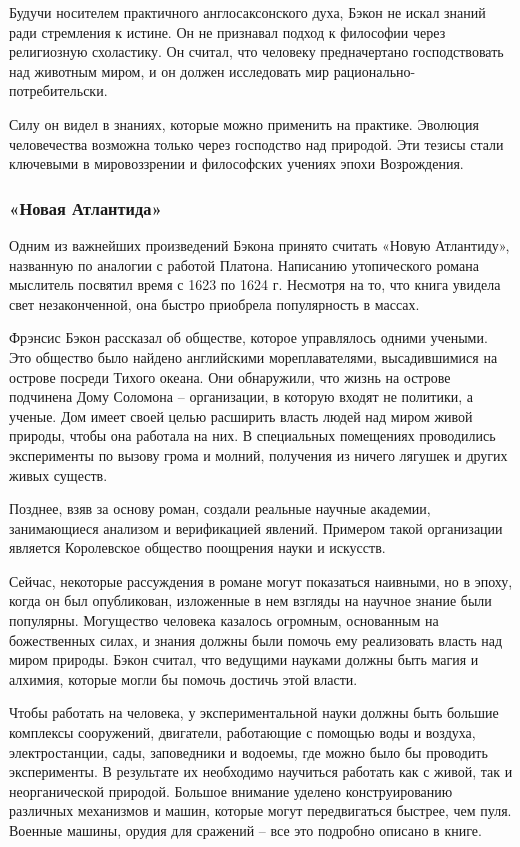 \documentclass[
]{article}
\begin{document}
Будучи носителем практичного англосаксонского духа, Бэкон не искал
знаний ради стремления к истине. Он не признавал подход к философии
через религиозную схоластику. Он считал, что человеку предначертано
господствовать над животным миром, и он должен исследовать мир
рационально-потребительски.

Силу он видел в знаниях, которые можно применить на практике. Эволюция
человечества возможна только через господство над природой. Эти тезисы
стали ключевыми в мировоззрении и философских учениях эпохи Возрождения.

\hypertarget{ux43dux43eux432ux430ux44f-ux430ux442ux43bux430ux43dux442ux438ux434ux430}{%
\subsubsection{«Новая
Атлантида»}\label{ux43dux43eux432ux430ux44f-ux430ux442ux43bux430ux43dux442ux438ux434ux430}}

Одним из важнейших произведений Бэкона принято считать «Новую
Атлантиду», названную по аналогии с работой Платона. Написанию
утопического романа мыслитель посвятил время с 1623 по 1624 г. Несмотря
на то, что книга увидела свет незаконченной, она быстро приобрела
популярность в массах.

Фрэнсис Бэкон рассказал об обществе, которое управлялось одними учеными.
Это общество было найдено английскими мореплавателями, высадившимися на
острове посреди Тихого океана. Они обнаружили, что жизнь на острове
подчинена Дому Соломона -- организации, в которую входят не политики, а
ученые. Дом имеет своей целью расширить власть людей над миром живой
природы, чтобы она работала на них. В специальных помещениях проводились
эксперименты по вызову грома и молний, получения из ничего лягушек и
других живых существ.

Позднее, взяв за основу роман, создали реальные научные академии,
занимающиеся анализом и верификацией явлений. Примером такой организации
является Королевское общество поощрения науки и искусств.

Сейчас, некоторые рассуждения в романе могут показаться наивными, но в
эпоху, когда он был опубликован, изложенные в нем взгляды на научное
знание были популярны. Могущество человека казалось огромным, основанным
на божественных силах, и знания должны были помочь ему реализовать
власть над миром природы. Бэкон считал, что ведущими науками должны быть
магия и алхимия, которые могли бы помочь достичь этой власти.

Чтобы работать на человека, у экспериментальной науки должны быть
большие комплексы сооружений, двигатели, работающие с помощью воды и
воздуха, электростанции, сады, заповедники и водоемы, где можно было бы
проводить эксперименты. В результате их необходимо научиться работать
как с живой, так и неорганической природой. Большое внимание уделено
конструированию различных механизмов и машин, которые могут
передвигаться быстрее, чем пуля. Военные машины, орудия для сражений --
все это подробно описано в книге.
\end{document}
